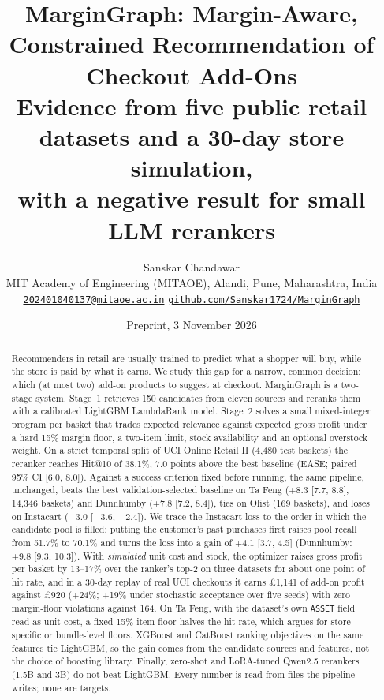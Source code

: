 \documentclass[11pt]{article}
\title{MarginGraph: Margin-Aware, Constrained Recommendation of Checkout Add-Ons\\[4pt]
\large Evidence from five public retail datasets and a 30-day store simulation,\\ with a negative result for small LLM rerankers}
\author{Sanskar Chandawar\\
\small MIT Academy of Engineering (MITAOE), Alandi, Pune, Maharashtra, India\\
\small \href{mailto:202401040137@mitaoe.ac.in}{\texttt{202401040137@mitaoe.ac.in}}\quad
\href{https://github.com/Sanskar1724/MarginGraph}{\texttt{github.com/Sanskar1724/MarginGraph}}}
\date{Preprint, 3 November 2026}
\begin{document}
\maketitle

\begin{abstract}
Recommenders in retail are usually trained to predict what a shopper will buy, while the store is paid by what it earns.
We study this gap for a narrow, common decision: which (at most two) add-on products to suggest at checkout.
MarginGraph is a two-stage system.
Stage~1 retrieves 150 candidates from eleven sources and reranks them with a calibrated LightGBM LambdaRank model.
Stage~2 solves a small mixed-integer program per basket that trades expected relevance against expected gross profit under a hard 15\% margin floor, a two-item limit, stock availability and an optional overstock weight.
On a strict temporal split of UCI Online Retail II (4,480 test baskets) the reranker reaches Hit@10 of 38.1\%, 7.0 points above the best baseline (EASE; paired 95\% CI [6.0, 8.0]).
Against a success criterion fixed before running, the same pipeline, unchanged, beats the best validation-selected baseline on Ta Feng (+8.3 [7.7, 8.8], 14,346 baskets) and Dunnhumby (+7.8 [7.2, 8.4]), ties on Olist (169 baskets), and loses on Instacart ($-3.0$ [$-3.6$, $-2.4$]).
We trace the Instacart loss to the order in which the candidate pool is filled: putting the customer's past purchases first raises pool recall from 51.7\% to 70.1\% and turns the loss into a gain of +4.1 [3.7, 4.5] (Dunnhumby: +9.8 [9.3, 10.3]).
With \emph{simulated} unit cost and stock, the optimizer raises gross profit per basket by 13--17\% over the ranker's top-2 on three datasets for about one point of hit rate, and in a 30-day replay of real UCI checkouts it earns \pounds1,141 of add-on profit against \pounds920 (+24\%; +19\% under stochastic acceptance over five seeds) with zero margin-floor violations against 164.
On Ta Feng, with the dataset's own \texttt{ASSET} field read as unit cost, a fixed 15\% item floor halves the hit rate, which argues for store-specific or bundle-level floors.
XGBoost and CatBoost ranking objectives on the same features tie LightGBM, so the gain comes from the candidate sources and features, not the choice of boosting library.
Finally, zero-shot and LoRA-tuned Qwen2.5 rerankers (1.5B and 3B) do not beat LightGBM.
Every number is read from files the pipeline writes; none are targets.
\end{abstract}

\end{document}
